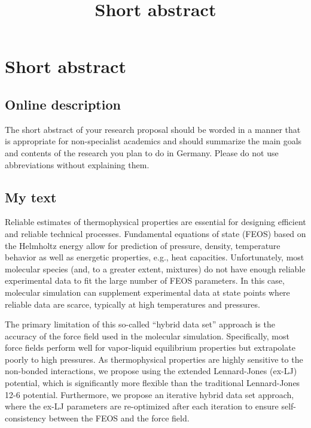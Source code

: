 \documentclass[12pt]{article}
\title{Short abstract}
\date{}
\begin{document}
	
	
	
	\section*{Short abstract}
	
	\subsection*{Online description}
	
	The short abstract of your research proposal should be worded in a manner that is appropriate for non-specialist academics and should summarize the main goals and contents of the research you plan to do in Germany. Please do not use abbreviations without explaining them.
	
	\subsection*{My text}
	
	Reliable estimates of thermophysical properties are essential for designing efficient and reliable technical processes. Fundamental equations of state (FEOS) based on the Helmholtz energy allow for prediction of pressure, density, temperature behavior as well as energetic properties, e.g., heat capacities. Unfortunately, most molecular species (and, to a greater extent, mixtures) do not have enough reliable experimental data to fit the large number of FEOS parameters. In this case, molecular simulation can supplement experimental data at state points where reliable data are scarce, typically at high temperatures and pressures. 
	
	The primary limitation of this so-called ``hybrid data set'' approach is the accuracy of the force field used in the molecular simulation. Specifically, most force fields perform well for vapor-liquid equilibrium properties but extrapolate poorly to high pressures. As thermophysical properties are highly sensitive to the non-bonded interactions, we propose using the extended Lennard-Jones (ex-LJ) potential, which is significantly more flexible than the traditional Lennard-Jones 12-6 potential. Furthermore, we propose an iterative hybrid data set approach, where the ex-LJ parameters are re-optimized after each iteration to ensure self-consistency between the FEOS and the force field.
	
\end{document}
